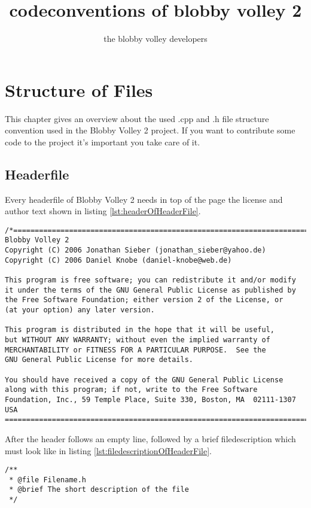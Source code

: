 \documentclass[a4paper]{scrartcl}
\title{codeconventions of blobby volley 2}
\author{the blobby volley developers}
\begin{document}
\begin{titlepage}
\maketitle
\thispagestyle{empty}
\end{titlepage}



\section{Structure of Files}
This chapter gives an overview about the used .cpp and .h file structure convention used in the Blobby Volley 2 project.
If you want to contribute some code to the project it's important you take care of it.
\subsection{Headerfile}
Every headerfile of Blobby Volley 2 needs in top of the page the license and author text shown in listing \ref{lst:headerOfHeaderFile}.
\begin{lstlisting}[caption=License and author text of a headerfile, label=lst:headerOfHeaderFile]
/*=============================================================================
Blobby Volley 2
Copyright (C) 2006 Jonathan Sieber (jonathan_sieber@yahoo.de)
Copyright (C) 2006 Daniel Knobe (daniel-knobe@web.de)

This program is free software; you can redistribute it and/or modify
it under the terms of the GNU General Public License as published by
the Free Software Foundation; either version 2 of the License, or
(at your option) any later version.

This program is distributed in the hope that it will be useful,
but WITHOUT ANY WARRANTY; without even the implied warranty of
MERCHANTABILITY or FITNESS FOR A PARTICULAR PURPOSE.  See the
GNU General Public License for more details.

You should have received a copy of the GNU General Public License
along with this program; if not, write to the Free Software
Foundation, Inc., 59 Temple Place, Suite 330, Boston, MA  02111-1307  USA
=============================================================================*/
\end{lstlisting}
After the header follows an empty line, followed by a brief filedescription which must look like in listing \ref{lst:filedescriptionOfHeaderFile}.
\begin{lstlisting}[caption=Filedescription of an headerfile, label=lst:filedescriptionOfHeaderFile]
/**
 * @file Filename.h
 * @brief The short description of the file
 */
\end{lstlisting}
\end{document}
